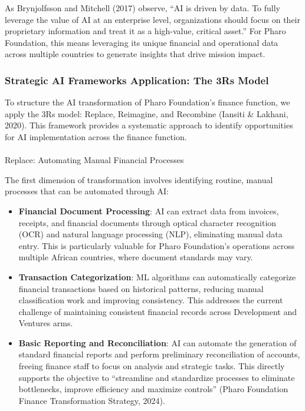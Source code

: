 \documentclass[
]{article}
\makeatletter
\let\oldparagraph\paragraph
\renewcommand{\paragraph}{
    \@ifstar
      \xxxParagraphStar
      \xxxParagraphNoStar
  }
\newcommand{\xxxParagraphStar}[1]{\oldparagraph*{#1}\mbox{}}
\newcommand{\xxxParagraphNoStar}[1]{\oldparagraph{#1}\mbox{}}
\makeatother
\begin{document}
As Brynjolfsson and Mitchell (2017) observe, ``AI is driven by data. To
fully leverage the value of AI at an enterprise level, organizations
should focus on their proprietary information and treat it as a
high-value, critical asset.'' For Pharo Foundation, this means
leveraging its unique financial and operational data across multiple
countries to generate insights that drive mission impact.

\subsubsection{Strategic AI Frameworks Application: The 3Rs
Model}\label{strategic-ai-frameworks-application-the-3rs-model}

To structure the AI transformation of Pharo Foundation's finance
function, we apply the 3Rs model: Replace, Reimagine, and Recombine
(Iansiti \& Lakhani, 2020). This framework provides a systematic
approach to identify opportunities for AI implementation across the
finance function.

\paragraph{Replace: Automating Manual Financial
Processes}\label{replace-automating-manual-financial-processes}

The first dimension of transformation involves identifying routine,
manual processes that can be automated through AI:

\begin{itemize}
\item
  \textbf{Financial Document Processing}: AI can extract data from
  invoices, receipts, and financial documents through optical character
  recognition (OCR) and natural language processing (NLP), eliminating
  manual data entry. This is particularly valuable for Pharo
  Foundation's operations across multiple African countries, where
  document standards may vary.
\item
  \textbf{Transaction Categorization}: ML algorithms can automatically
  categorize financial transactions based on historical patterns,
  reducing manual classification work and improving consistency. This
  addresses the current challenge of maintaining consistent financial
  records across Development and Ventures arms.
\item
  \textbf{Basic Reporting and Reconciliation}: AI can automate the
  generation of standard financial reports and perform preliminary
  reconciliation of accounts, freeing finance staff to focus on analysis
  and strategic tasks. This directly supports the objective to
  ``streamline and standardize processes to eliminate bottlenecks,
  improve efficiency and maximize controls'' (Pharo Foundation Finance
  Transformation Strategy, 2024).
\end{itemize}
\end{document}
